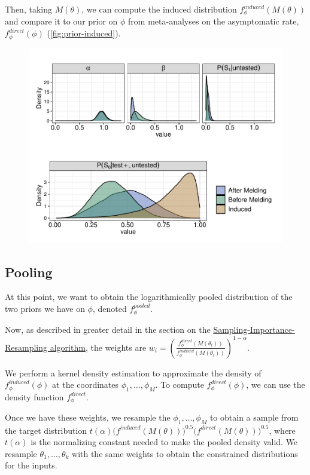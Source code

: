 \documentclass[12pt,twoside]{smiththesis}
\begin{document}
Then, taking \(M(\theta)\), we can compute the induced distribution \(f_\phi^{induced}(M(\theta))\) and compare it to our prior on \(\phi\) from meta-analyses on the asymptomatic rate, \(f_\phi^{direct}(\phi)\) (\ref{fig:prior-induced}).
\begin{figure}

{\centering \includegraphics[width=1\linewidth]{thesis_files/figure-latex/unnamed-chunk-11-1} 

}

\caption{\label{fig:prior-induced}}\label{fig:unnamed-chunk-11}
\end{figure}
\hypertarget{pooling}{%
\subsection{Pooling}\label{pooling}}

At this point, we want to obtain the logarithmically pooled distribution of the two priors we have on \(\phi\), denoted \(f_\phi^{pooled}\).

Now, as described in greater detail in the section on the \protect\hyperlink{logpooled}{Sampling-Importance-Resampling algorithm}, the weights are \(w_i = \left( \frac{f_\phi^{direct}(M(\theta_i))}{f_\phi^{induced}(M(\theta_i))} \right)^{1-\alpha}.\)

We perform a kernel density estimation to approximate the density of \(f_\phi^{induced}(\phi)\) at the coordinates \(\phi_1, \dots, \phi_M\). To compute \(f_\phi^{direct}(\phi)\), we can use the density function \(f_\phi^{direct}\).

Once we have these weights, we resample the \(\phi_1,\dots,\phi_M\) to obtain a sample from the target distribution \(t(\alpha) \Big( f^{induced}(M(\theta)) \Big)^{0.5} \Big( f^{direct} (M(\theta)) \Big)^{0.5}\), where \(t(\alpha)\) is the normalizing constant needed to make the pooled density valid. We resample \(\theta_1, \dots, \theta_k\) with the same weights to obtain the constrained distributions for the inputs.
\end{document}
